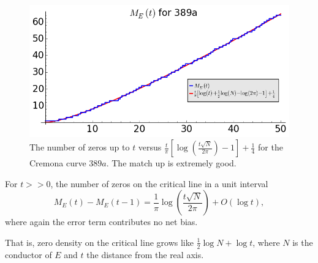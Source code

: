 \begin{figure}[!h]
    \centering
    \includegraphics[width=1.0\textwidth]{graphics/M_E_389.png}
    \caption{The number of zeros up to $t$ versus $\frac{t}{\pi}\left[\log\left(\frac{t\sqrt{N}}{2\pi}\right) -1 \right] + \frac{1}{4}$ for the Cremona curve $389a$. The match up is extremely good.}
    \label{fig:M_E_389}
\end{figure}

\begin{corollary}
For $t>>0$, the number of zeros on the critical line in a unit interval
\begin{equation}
M_E(t)-M_E(t-1) = \frac{1}{\pi}\log\left(\frac{t\sqrt{N}}{2\pi}\right) + O(\log t),
\end{equation}
where again the error term contributes no net bias.
\end{corollary}

That is, zero density on the critical line grows like $\frac{1}{2}\log N + \log t$, where $N$ is the conductor of $E$ and $t$ the distance from the real axis. \\

